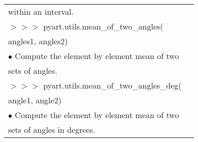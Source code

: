 \documentclass[potrait,a0paper,fontscale=0.33]{baposter} %
\begin{document}
\begin{poster}
{\begin{flushleft}
\begin{tabular}{@{}ll@{}}
\-\hspace{0.7cm} within an interval.\\
$>$$>$$>$ pyart.utils.mean\_of\_two\_angles(\\
\-\hspace{1.5cm} angles1, angles2)\\
\-\hspace{0.4cm} $\bullet$ Compute the element by element mean of two\\
\-\hspace{0.7cm} sets of angles.\\
$>$$>$$>$ pyart.utils.mean\_of\_two\_angles\_deg(\\
\-\hspace{1.5cm} angle1, angle2)\\
\-\hspace{0.4cm} $\bullet$ Compute the element by element mean of two\\
\-\hspace{0.7cm} sets of angles in degrees.\\
\end{tabular}


\end{flushleft}}
\end{poster}
\end{document}
